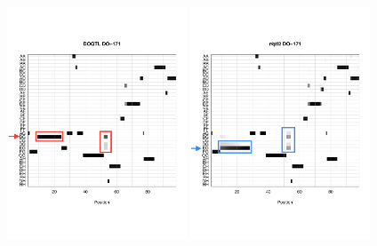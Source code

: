 \documentclass[12pt,t]{beamer}
\begin{document}
		\begin{frame}
			\begin{figure}
					\vspace{-0.1in}
				{\includegraphics[height=3.7in, width=2.1in]{figures/uni_probs_heat_171_doqtl_markup2.pdf}} 
				{\includegraphics[height=3.7in, width=2.1in]{figures/uni_probs_heat_171_rqtl2_markup2.pdf}}
			\end{figure}	
		\end{frame}
	
\end{document}
